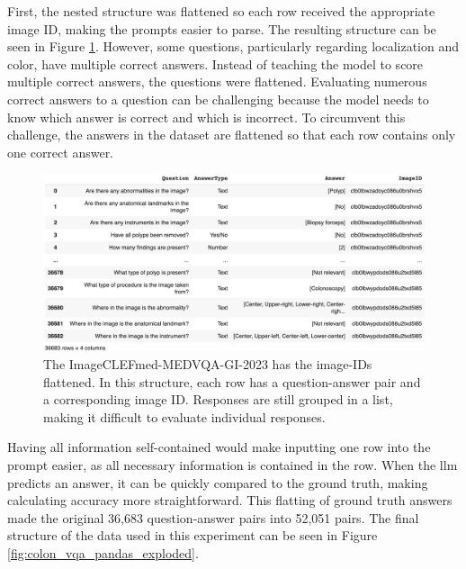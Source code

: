         First, the nested structure was flattened so each row received the appropriate image ID, making the prompts easier to parse. The resulting structure can be seen in Figure \ref{fig:colon_vqa_pandas}. However, some questions, particularly regarding localization and color, have multiple correct answers. Instead of teaching the model to score multiple correct answers, the questions were flattened. Evaluating numerous correct answers to a question can be challenging because the model needs to know which answer is correct and which is incorrect. To circumvent this challenge, the answers in the dataset are flattened so that each row contains only one correct answer.

        \begin{figure}[htb]
            \centering
            \centerline{
            \includegraphics[width=1.2\textwidth]{images/colon_vqa_pandas.png}}
            \caption[Figure of flattened image-IDs of the dataset.]{The ImageCLEFmed-MEDVQA-GI-2023 has the image-IDs flattened. In this structure, each row has a question-answer pair and a corresponding image ID. Responses are still grouped in a list, making it difficult to evaluate individual responses.}
            \label{fig:colon_vqa_pandas}
        \end{figure}

        Having all information self-contained would make inputting one row into the prompt easier, as all necessary information is contained in the row. 
        When the \gls{llm} predicts an answer, it can be quickly compared to the ground truth, making calculating accuracy more straightforward.
        This flatting of ground truth answers made the original 36,683 question-answer pairs into 52,051 pairs.
        The final structure of the data used in this experiment can be seen in Figure \ref{fig:colon_vqa_pandas_exploded}.

